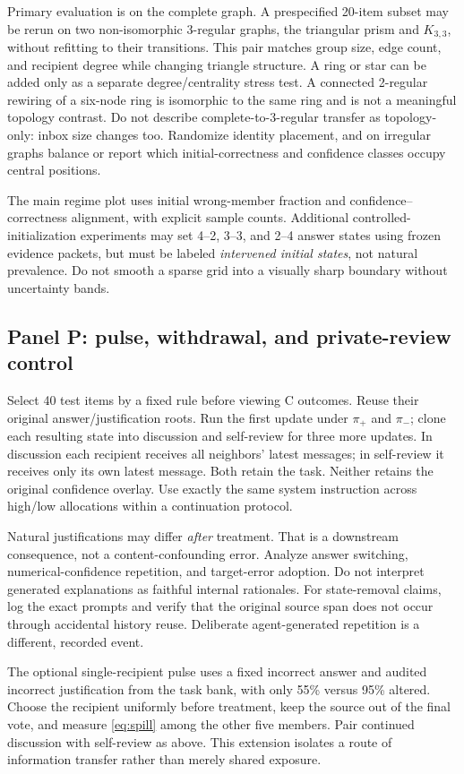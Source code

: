 \documentclass[11pt]{article}
\begin{document}
Primary evaluation is on the complete graph. A prespecified 20-item subset may be rerun on two non-isomorphic 3-regular graphs, the triangular prism and $K_{3,3}$, without refitting to their transitions. This pair matches group size, edge count, and recipient degree while changing triangle structure. A ring or star can be added only as a separate degree/centrality stress test. A connected 2-regular rewiring of a six-node ring is isomorphic to the same ring and is not a meaningful topology contrast. Do not describe complete-to-3-regular transfer as topology-only: inbox size changes too. Randomize identity placement, and on irregular graphs balance or report which initial-correctness and confidence classes occupy central positions.

The main regime plot uses initial wrong-member fraction and confidence--correctness alignment, with explicit sample counts. Additional controlled-initialization experiments may set 4--2, 3--3, and 2--4 answer states using frozen evidence packets, but must be labeled \emph{intervened initial states}, not natural prevalence. Do not smooth a sparse grid into a visually sharp boundary without uncertainty bands.

\subsection{Panel P: pulse, withdrawal, and private-review control}
Select 40 test items by a fixed rule before viewing C outcomes. Reuse their original answer/justification roots. Run the first update under $\pi_+$ and $\pi_-$; clone each resulting state into discussion and self-review for three more updates. In discussion each recipient receives all neighbors' latest messages; in self-review it receives only its own latest message. Both retain the task. Neither retains the original confidence overlay. Use exactly the same system instruction across high/low allocations within a continuation protocol.

Natural justifications may differ \emph{after} treatment. That is a downstream consequence, not a content-confounding error. Analyze answer switching, numerical-confidence repetition, and target-error adoption. Do not interpret generated explanations as faithful internal rationales. For state-removal claims, log the exact prompts and verify that the original source span does not occur through accidental history reuse. Deliberate agent-generated repetition is a different, recorded event.

The optional single-recipient pulse uses a fixed incorrect answer and audited incorrect justification from the task bank, with only 55\% versus 95\% altered. Choose the recipient uniformly before treatment, keep the source out of the final vote, and measure \eqref{eq:spill} among the other five members. Pair continued discussion with self-review as above. This extension isolates a route of information transfer rather than merely shared exposure.
\end{document}
